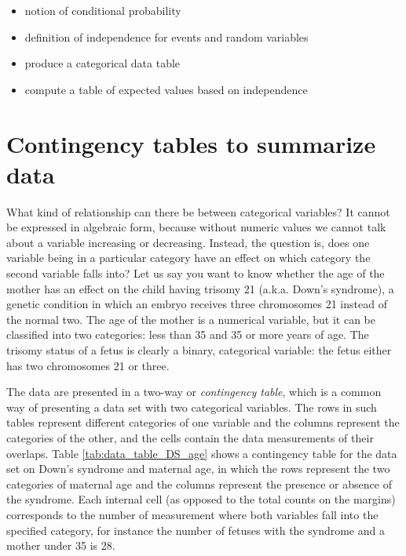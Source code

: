 \documentclass[
  letterpaper,
  DIV=11,
  numbers=noendperiod]{scrreprt}
\begin{document}
\begin{itemize}
\item
  notion of conditional probability
\item
  definition of independence for events and random variables
\item
  produce a categorical data table
\item
  compute a table of expected values based on independence
\end{itemize}

\hypertarget{contingency-tables-to-summarize-data}{%
\section{Contingency tables to summarize
data}\label{contingency-tables-to-summarize-data}}

What kind of relationship can there be between categorical variables? It
cannot be expressed in algebraic form, because without numeric values we
cannot talk about a variable increasing or decreasing. Instead, the
question is, does one variable being in a particular category have an
effect on which category the second variable falls into? Let us say you
want to know whether the age of the mother has an effect on the child
having trisomy 21 (a.k.a. Down's syndrome), a genetic condition in which
an embryo receives three chromosomes 21 instead of the normal two. The
age of the mother is a numerical variable, but it can be classified into
two categories: less than 35 and 35 or more years of age. The trisomy
status of a fetus is clearly a binary, categorical variable: the fetus
either has two chromosomes 21 or three.

The data are presented in a two-way or \emph{contingency table}, which
is a common way of presenting a data set with two categorical variables.
The rows in such tables represent different categories of one variable
and the columns represent the categories of the other, and the cells
contain the data measurements of their overlaps. Table
\ref{tab:data_table_DS_age} shows a contingency table for the data set
on Down's syndrome and maternal age, in which the rows represent the two
categories of maternal age and the columns represent the presence or
absence of the syndrome. Each internal cell (as opposed to the total
counts on the margins) corresponds to the number of measurement where
both variables fall into the specified category, for instance the number
of fetuses with the syndrome and a mother under 35 is 28.
\end{document}
